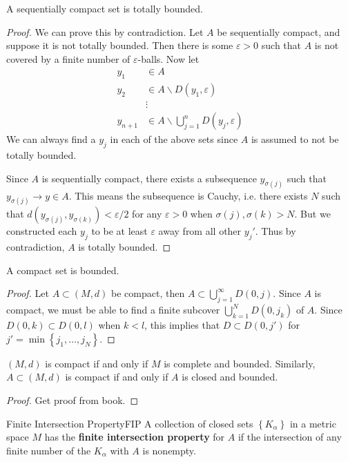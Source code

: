 \documentclass[10pt]{report}
\begin{document}
\begin{prop}
	A sequentially compact set is totally bounded.
\end{prop}
\begin{proof}
	We can prove this by contradiction. Let $A$ be sequentially compact, and suppose it is not totally bounded. Then there is some $\varepsilon>0$ such that $A$ is not covered by a finite number of $\varepsilon$-balls. Now let
	\begin{align*}
		y_1 &\in A \\
		y_2 &\in A \backslash D(y_1,\varepsilon) \\
		    &\vdots \\
		y_{n+1} &\in A \backslash \bigcup_{j=1}^n D(y_j, \varepsilon)
	\end{align*}
	We can always find a $y_j$ in each of the above sets since $A$ is assumed to not be totally bounded.

	Since $A$ is sequentially compact, there exists a subsequence $y_{\sigma(j)}$ such that $y_{\sigma(j)}\to y \in A$. This means the subsequence is Cauchy, i.e. there exists $N$ such that $d(y_{\sigma(j)}, y_{\sigma(k)}) < \varepsilon/2$ for any $\varepsilon>0$ when $\sigma(j),\sigma(k) > N$. But we constructed each $y_j$ to be at least $\varepsilon$ away from all other $y_j'$. Thus by contradiction, $A$ is totally bounded.
\end{proof}

\begin{prop}
	A compact set is bounded.
\end{prop}
\begin{proof}
	Let $A \subset (M,d)$ be compact, then $A \subset \bigcup_{j=1}^\infty D(0,j)$. Since $A$ is compact, we must be able to find a finite subcover $\bigcup_{k=1}^N D(0,j_k)$ of $A$. Since $D(0,k) \subset D(0,l)$ when $k<l$, this implies that $D \subset D(0, j')$ for $j' = \min\left\{ j_1, \dots, j_N \right\}$.
\end{proof}

\begin{thrm}{}{}
	$(M,d)$ is compact if and only if $M$ is complete and bounded. Similarly, $A \subset (M,d)$ is compact if and only if $A$ is closed and bounded.
\end{thrm}
\begin{proof}
	{\color{red}Get proof from book.} 
\end{proof}


\begin{defn}{Finite Intersection Property}{FIP}
	A collection of closed sets $\left\{ K_\alpha \right\}$ in a metric space $M$ has the \textbf{finite intersection property} for $A$ if the intersection of any finite number of the $K_\alpha$ with $A$ is nonempty.
\end{defn}
\end{document}
